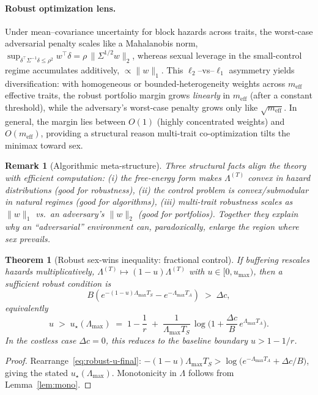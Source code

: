 \documentclass[11pt]{article}
\theoremstyle{upright}
\newtheorem{theorem}{Theorem}
\newtheorem{remark}{Remark}
\newcommand{\horizon}{\Lambda}
\newcommand{\Lmax}{\horizon^{(T)}_{\max}}
\newcommand{\hazT}[1]{\Lambda^{(#1)}}          %
\renewcommand{\Lmax}{\Lambda_{\max}}
\begin{document}
\paragraph{Robust optimization lens.}
Under mean–covariance uncertainty for block hazards across traits, the worst-case adversarial penalty scales like a Mahalanobis norm,
\(\sup_{\delta^\top \Sigma^{-1}\delta\le \rho^2} w^\top \delta = \rho\,\|\Sigma^{1/2}w\|_2\),
whereas sexual leverage in the small-control regime accumulates additively, \(\propto \|w\|_1\).
This \(\ell_2\)–vs–\(\ell_1\) asymmetry yields diversification: with homogeneous or bounded-heterogeneity weights across
\(m_{\mathrm{eff}}\) effective traits, the robust portfolio margin grows \emph{linearly} in \(m_{\mathrm{eff}}\) (after a constant threshold),
while the adversary’s worst-case penalty grows only like \(\sqrt{m_{\mathrm{eff}}}\).
In general, the margin lies between \(O(1)\) (highly concentrated weights) and \(O(m_{\mathrm{eff}})\),
providing a structural reason multi-trait co-optimization tilts the minimax toward sex.

\begin{remark}[Algorithmic meta-structure]
Three structural facts align the theory with efficient computation:
(i) the free-energy form makes $\hazT{T}$ convex in hazard distributions (good for robustness),
(ii) the control problem is convex/submodular in natural regimes (good for algorithms),
(iii) multi-trait robustness scales as $\|w\|_1$ vs.\ an adversary’s $\|w\|_2$ (good for portfolios).
Together they explain why an “adversarial” environment can, paradoxically, enlarge the region where sex prevails.
\end{remark}

\begin{theorem}[Robust sex-wins inequality: fractional control]\label{thm:robust-frac}
If buffering rescales hazards multiplicatively, $\hazT{T}\mapsto(1-u)\hazT{T}$ with $u\in[0,u_{\max})$, then a sufficient robust condition is
\begin{equation}\label{eq:robust-u-final}
B\!\left(e^{-(1-u)\Lmax T_S}-e^{-\Lmax T_A}\right) \;>\; \Delta c,
\end{equation}
equivalently
\[
u \;>\; u_\star(\Lmax)
\;=\; 1-\frac{1}{r} \;+\; \frac{1}{\Lmax T_S}\,\log\!\Big(1+\frac{\Delta c}{B}\,e^{\Lmax T_A}\Big).
\]
In the costless case $\Delta c=0$, this reduces to the baseline boundary $u>1-1/r$.
\end{theorem}

\begin{proof}
Rearrange~\eqref{eq:robust-u-final}:
$-(1-u)\Lmax T_S > \log\!\big(e^{-\Lmax T_A}+\Delta c/B\big)$, giving the stated $u_\star(\Lmax)$.
Monotonicity in $\Lambda$ follows from Lemma~\ref{lem:mono}.
\end{proof}
\end{document}

